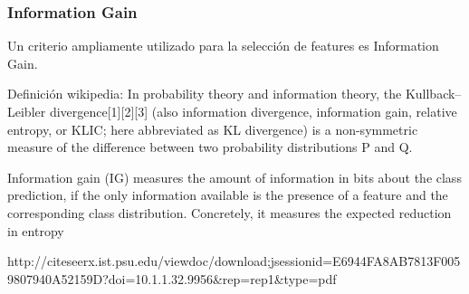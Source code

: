 \subsubsection{Information Gain}
Un criterio ampliamente utilizado para la selección de features es Information Gain.

Definición wikipedia:
In probability theory and information theory, the Kullback–Leibler divergence[1][2][3] (also information divergence, information gain, relative entropy, or KLIC; here abbreviated as KL divergence) is a non-symmetric measure of the difference between two probability distributions P and Q.

\citet{infgain}
Information gain (IG) measures the amount of information in bits about the
class prediction, if the only information available is the presence of a feature
and the corresponding class distribution. Concretely, it measures the expected
reduction in entropy

http://citeseerx.ist.psu.edu/viewdoc/download;jsessionid=E6944FA8AB7813F0059807940A52159D?doi=10.1.1.32.9956&rep=rep1&type=pdf


